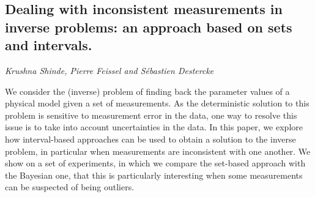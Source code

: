 \documentclass[../booklet.tex]{subfiles}
\begin{document}
\subsection[Dealing with inconsistent measurements in inverse problems: an approach based on sets and intervals.. {\it Krushna Shinde, Pierre Feissel and Sébastien Destercke}]{Dealing with inconsistent measurements in inverse problems: an approach based on sets and intervals.}
  

\begin{center}
  {\it Krushna Shinde, Pierre Feissel and Sébastien Destercke}
\end{center}

\vskip 0.8cm


We consider the (inverse) problem of finding back the parameter values of a physical model given a set of measurements. As the deterministic solution to this problem is sensitive to measurement error in the data, one way to resolve this issue is to take into account uncertainties in the data. In this paper, we explore how interval-based approaches can be used to obtain a solution to the inverse problem, in particular when measurements are inconsistent with one another. We show on a set of experiments, in which we compare the set-based approach with the Bayesian one, that this is particularly interesting when some measurements can be suspected of being outliers.  
\end{document}
